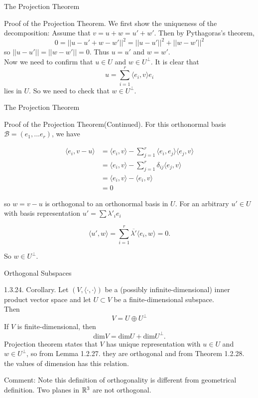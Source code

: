 \documentclass[hyperref={pdfpagelabels=true}]{beamer}
\newcommand{\<}{\langle}
\renewcommand{\>}{\rangle}
\begin{document}
\begin{frame}{The Projection Theorem}
    \begin{block}{Proof of the Projection Theorem.}
        We first show the uniqueness of the decomposition: Assume that $v = u+w = u'+w'$. Then by Pythagoras's theorem,
        \[0 = ||u-u'+w-w'||^{2} = ||u-u'||^{2}+||w-w'||^{2}\]
        so $||u-u'|| = ||w-w'|| = 0$. Thus $u = u'$ and $w = w'$.\\
        Now we need to confirm that $u \in U$ and $w \in U^{\bot}$. It is clear that 
        \[u = \sum_{i = 1}^{r}\<e_{i},v\>e_{i}\]
        lies in $U$. So we need to check that $w \in U^{\bot}$.
    \end{block}
\end{frame}
\begin{frame}{The Projection Theorem}
    \begin{block}{Proof of the Projection Theorem(Continued).}
        For this orthonormal basis $\mathcal{B} = (e_{1},...e_{r})$, we have
        \begin{spacing}{0.8}
        \[
            \begin{aligned}
                \<e_{i},v-u\> &= \<e_{i},v\>-\sum_{j = 1}^{r}\<e_{i},e_{j}\>\<e_{j},v\> \\
                &= \<e_{i},v\>-\sum_{j = 1}^{r}\delta_{ij}\<e_{j},v\> \\
                &= \<e_{i},v\>-\<e_{i},v\>\\
                &= 0
            \end{aligned}
        \]
        \end{spacing}
        so $w = v-u$ is orthogonal to an orthonormal basis in $U$. For an arbitrary $u' \in U$ with basis representation $u' = \sum \lambda'_{i}e_{i}$
        \begin{spacing}{0.8}
        \[\<u',w\> = \sum_{i = 1}^{r}\overline{\lambda'}\<e_{i},w\> = 0.\]
        \end{spacing}
        So $w \in U^{\bot}$.
    \end{block}
\end{frame}
\begin{frame}{Orthogonal Subspaces}
    \begin{block}{1.3.24. Corollary.} 
        Let $(V,\<\cdot,\cdot\>)$ be a (possibly infinite-dimensional) inner product vector space and let $U \subset V$ be a finite-dimensional subspace.\\
        Then 
        \[V = U \oplus U^{\bot}\]
        If $V$ is finite-dimensional, then 
        \[\text{dim}V = \text{dim}U + \text{dim}U^{\bot}.\]
        Projection theorem states that $V$ has unique representation with $u \in U$ and $w \in U^{\bot}$, so from Lemma 1.2.27. they are orthogonal and from Theorem 1.2.28. the values of dimension has this relation.
    \end{block}
    \begin{block}{Comment:}
        Note this definition of orthogonality is different from geometrical definition. Two planes in $\mathbb{R}^{3}$ are not orthogonal.
    \end{block}
\end{frame}
\end{document}
